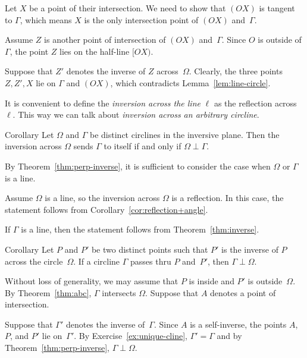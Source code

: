 Let $X$ be a point of their intersection.
We need to show that $(OX)$ is tangent to $\Gamma$, which means $X$ is the only intersection point of $(OX)$ and~$\Gamma$.

Assume $Z$ is another point of intersection of $(OX)$ and~$\Gamma$.
Since $O$ is outside of $\Gamma$, 
the point $Z$ lies on the half-line $[OX)$.

Suppose that $Z'$ denotes the inverse of $Z$ across~$\Omega$.
Clearly, the three points $Z, Z', X$ lie on $\Gamma$ and $(OX)$, which contradicts Lemma~\ref{lem:line-circle}.
\qeds 

It is convenient to define the 
\emph{inversion across the line} $\ell$
as the reflection across $\ell$.
This way we can talk about \emph{inversion across an arbitrary circline}.

\begin{thm}{Corollary}\label{cor:perp-inverse-clines}
Let $\Omega$  and $\Gamma$ be distinct circlines in the inversive plane.
Then
the inversion across $\Omega$ sends $\Gamma$ to itself if and only if $\Omega\perp\Gamma$.
\end{thm}

By Theorem~\ref{thm:perp-inverse}, it is sufficient to consider the case when $\Omega$ or $\Gamma$ is a line.

Assume $\Omega$ is a line, so the inversion across $\Omega$ is a reflection.
In this case, the statement follows from Corollary~\ref{cor:reflection+angle}.

If $\Gamma$ is a line, 
then the statement follows from Theorem~\ref{thm:inverse}.
\qeds

\begin{thm}{Corollary}\label{cor:perp-inverse}
Let $P$ and $P'$ be two distinct points
such that $P'$ is the inverse of $P$ across the circle~$\Omega$.
If a circline $\Gamma$ passes thru $P$ and~$P'$, then $\Gamma\perp\Omega$.
\end{thm}

Without loss of generality, we may assume that $P$ is inside and $P'$ is outside~$\Omega$.
By Theorem~\ref{thm:abc}, $\Gamma$ intersects $\Omega$.
Suppose that $A$ denotes a point of intersection.

Suppose that $\Gamma'$ denotes the inverse of~$\Gamma$.
Since $A$ is a self-inverse, the points $A$, $P$, and $P'$ lie on~$\Gamma'$.
By Exercise~\ref{ex:unique-cline},
$\Gamma'=\Gamma$
and by Theorem~\ref{thm:perp-inverse}, $\Gamma\perp\Omega$.
\qeds

